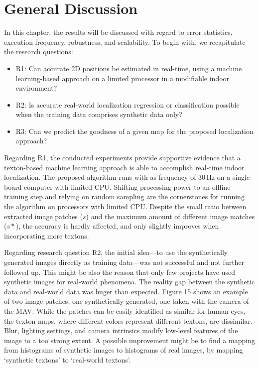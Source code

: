 \section{General Discussion}
\label{sec:generaldiscussion}

In this chapter, the results will be discussed with regard to error
statistics, execution frequency, robustness, and scalability. To begin
with, we recapitulate the research questions:

\begin{itemize}
\item R1: Can accurate 2D positions be estimated in real-time, using a
  machine learning-based approach on a limited processor in a
  modifiable indoor environment?
\item R2: Is accurate real-world localization regression or classification
  possible when the training data comprises synthetic data only?
\item R3: Can we predict the goodness of a given map for the proposed
  localization approach?
\end{itemize}

Regarding R1, the conducted experiments provide supportive evidence
that a texton-based machine learning approach is able to accomplish
real-time indoor localization. The proposed algorithm runs with as
frequency of 30\,Hz on a single board computer with limited
CPU. Shifting processing power to an offline training step and relying
on random sampling are the cornerstones for running the algorithm on
processors with limited CPU. Despite the small ratio between extracted
image patches ($s$) and the maximum amount of different image matches
($s*$), the accuracy is hardly affected, and only slightly improves
when incorporating more textons.

Regarding research question R2, the initial idea—to use the synthetically generated images directly as training data—was not successful and not further followed up. This might be also the reason that only few projects have used synthetic images for real-world phenomena. The reality gap between the synthetic data and real-world data was huger than expected. Figure 15 shows an example of two image patches, one synthetically generated, one taken with the camera of the MAV. While the patches can be easily identified as similar for human eyes, the texton maps, where different colors represent different textons, are dissimilar. Blur, lighting settings, and camera intrinsics modify low-level features of the image to a too strong extent. A possible improvement might be to find a mapping from histograms of synthetic images to histograms of real images, by mapping ‘synthetic textons’ to ‘real-world textons’.

